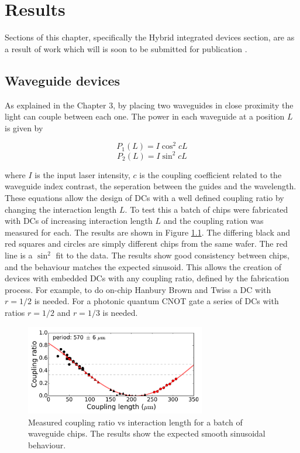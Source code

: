 
 \chapter{Results}

Sections of this chapter, specifically the Hybrid integrated devices section,
are as a result of work which will is soon to be submitted for publication
\cite{murray2015}.

\section{Waveguide devices} \label{sec:wg_devices} As explained in the Chapter
3, by placing two waveguides in close proximity the light can couple between
each one. The power in each waveguide at a position $L$ is given by

\begin{equation} P_1(L) = I \cos^2 cL \end{equation} \begin{equation} P_2(L) = I
\sin^2 cL \end{equation}

where $I$ is the input laser intensity, $c$ is the coupling coefficient related
to the waveguide index contrast, the seperation between the guides and the
wavelength. These equations allow the design of DCs with a well defined coupling
ratio by changing the interaction length $L$. To test this a batch of chips were
fabricated with DCs of increasing interaction length $L$ and the coupling ration
was measured for each. The results are shown in Figure \ref{fig:dc_length}. The
differing black and red squares and circles are simply different chips from the
same wafer. The red line is a $\sin^2$ fit to the data. The results show good
consistency between chips, and the behaviour matches the expected sinusoid. This
allows the creation of devices with embedded DCs with any coupling ratio,
defined by the fabrication process. For example, to do on-chip Hanbury Brown and
Twiss a DC with $r = 1/2$ is needed. For a photonic quantum CNOT gate a series
of DCs with ratios $r = 1/2$ and $r = 1/3$ is needed.

\begin{figure}[h!] \begin{center}
\includegraphics[width=0.7\textwidth]{images/W008_DC_processing.png}
\caption{Measured coupling ratio vs interaction length for a batch of waveguide
chips. The results show the expected smooth sinusoidal behaviour.}
\label{fig:dc_length} \end{center} \end{figure}

